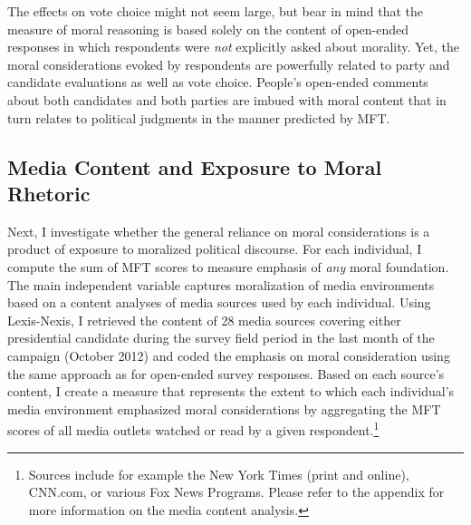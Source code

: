 \documentclass[12pt]{article}
\begin{document}
The effects on vote choice might not seem large, but bear in mind that the measure of moral reasoning is based solely on the content of open-ended responses in which respondents were \textit{not} explicitly asked about morality. Yet, the moral considerations evoked by respondents are powerfully related to party and candidate evaluations as well as vote choice. People's open-ended comments about both candidates and both parties are imbued with moral content that in turn relates to political judgments in the manner predicted by MFT.


\subsection*{Media Content and Exposure to Moral Rhetoric}

Next, I investigate whether the general reliance on moral considerations is a product of exposure to moralized political discourse. For each individual, I compute the sum of MFT scores to measure emphasis of \textit{any} moral foundation. The main independent variable captures moralization of media environments based on a content analyses of media sources used by each individual. Using Lexis-Nexis, I retrieved the content of 28 media sources covering either presidential candidate during the survey field period in the last month of the campaign (October 2012) and coded the emphasis on moral consideration using the same approach as for open-ended survey responses. Based on each source's content, I create a measure that represents the extent to which each individual's media environment emphasized moral considerations by aggregating the MFT scores of all media outlets watched or read by a given respondent.\footnote{Sources include for example the New York Times (print and online), CNN.com, or various Fox News Programs. Please refer to the appendix for more information on the media content analysis.}
\end{document}
